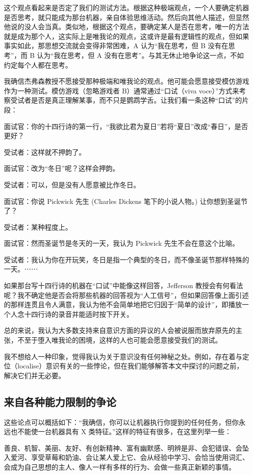 \documentclass[12pt,a4paper,twoside]{article}
\begin{document}
这个观点看起来是否定了我们的测试方法。根据这种极端观点，一个人要确定机器是否思考，就只能成为那台机器，亲自体验思维活动。然后向其他人描述，但显然他说的没人会当真。类似地，根据这个观点，要确定某人是否在思考，唯一的方法就是成为那个人，这实际上是唯我论的观点，这或许是最有逻辑性的观点，但如果事实如此，那思想交流就会变得非常困难，A 认为“我在思考，但 B 没有在思考”，而 B 认为“我在思考，但 A 没有在思考”。与其无休止地争论这一点，不如约定每个人都在思考。

我确信杰弗森教授不愿接受那种极端和唯我论的观点。他可能会愿意接受模仿游戏作为一种测试。模仿游戏（忽略游戏者 B）通常通过“口试（viva voce）”方式来考察受试者是否是真正理解某事，而不只是鹦鹉学舌。让我们看一条这种“口试”的片段：

面试官：你的十四行诗的第一行，“我欲比君为夏日”若将“夏日”改成“春日”，是否更好？

受试者：这样就不押韵了。

面试官：改为“冬日”呢？这样会押韵。

受试者：可以，但是没有人愿意被比作冬日。

面试官：你说 Pickwick 先生 (Charles Dickens 笔下的小说人物。) 让你想到圣诞节了？

受试者：某种程度上。

面试官：然而圣诞节是冬天的一天，我认为 Pickwick 先生不会在意这个比喻。

受试者：我认为你在开玩笑，冬日是指一个典型的冬日，而不像圣诞节那样特殊的一天。⋯⋯

如果那台写十四行诗的机器在“口试”中能像这样回答，Jefferson 教授会有何看法呢？我不确定他是否会将那些机器的回答视为“人工信号”，但如果回答像上面引述的那样连贯且令人满意，我认为他不会简单地把它归因于“简单的设计”，即播放一个人念十四行诗的录音并能适时按下开关。

总的来说，我认为大多数支持来自意识方面的异议的人会被说服而放弃原先的主张，不至于堕入唯我论的困境，这样的人也可能会愿意接受我们的测试。

我不想给人一种印象，觉得我认为关于意识没有任何神秘之处。例如，存在着与定位（localise）意识有关的一些悖论，但在我们能够解答本文中探讨的问题之前，解决它们并无必要。

\subsection{来自各种能力限制的争论}
这些论点可以概括如下：“我确信，你可以让机器执行你提到的任何任务，但你永远也不能使一台机器具有 X 类特征。”这样的特征有很多，在这里列举一些：

善良、机智、美丽、友好、有创新精神、富有幽默感、明辨是非、会犯错误、会坠入爱河、享受草莓和奶油、会让某人爱上它、会从经验中学习、会恰当使用词汇、会成为自己思想的主人、像人一样有多样的行为、会做一些真正新颖的事情。
\end{document}
